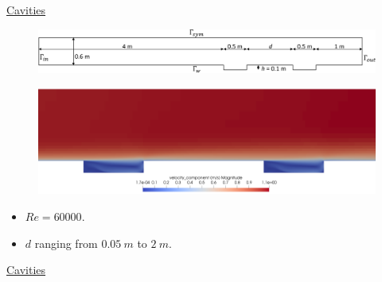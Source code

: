 \documentclass{beamer}
\begin{document}
\begin{frame}[label=cavities]{\hyperlink{cavitiesSupp}{Cavities}}
\begin{figure}
	\centering
	\includegraphics[width=\textwidth]{cavities_domain.pdf}
\end{figure}
\begin{figure}
	\centering
	\includegraphics[width=\textwidth, trim={0 0 0 6cm}, 
	clip]{cavities_dist1_vel.png}
\end{figure}
\begin{itemize}
	\item $Re = 60000$.
	\item $d$ ranging from $\SI{0.05}{m}$ to $\SI{2}{m}$.
\end{itemize}
\end{frame}
\begin{frame}{\hyperlink{cavitiesSupp}{Cavities}}
\begin{figure}
	\centering
	\subfloat[\scriptsize $u$ profile at $y=h$, 
	$d=\SI{1}{m}$]{\hspace{-0.5cm}}
\end{figure}
\end{frame}
\end{document}
